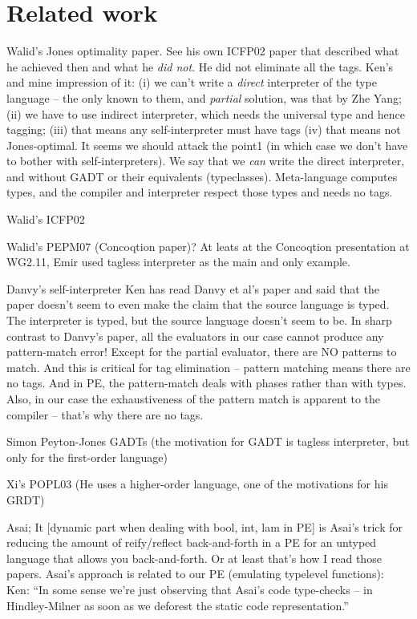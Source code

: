\documentclass[preprint]{sigplanconf}
\begin{document}
\section{Related work}
Walid's Jones optimality paper. See his own ICFP02 paper that
described what he achieved then and what he \emph{did not}. He did not
eliminate all the tags. Ken's and mine impression of it:
(i) we can't write a \emph{direct} interpreter of the type language
           -- the only known to them, and \emph{partial} solution, was 
              that by Zhe Yang;
(ii) we have to use indirect interpreter, which needs the universal
           type and hence tagging;
(iii) that means any self-interpreter must have tags
(iv) that means not Jones-optimal.
It seems we should attack the point1 (in which case we don't have to
bother with self-interpreters). We say that we \emph{can} write the direct
interpreter, and without GADT or their equivalents (typeclasses).
Meta-language computes types, and the compiler and interpreter respect
those types and needs no tags.


Walid's ICFP02

Walid's PEPM07 (Concoqtion paper)? At leats at the Concoqtion
presentation at WG2.11, Emir used tagless interpreter as the main and
only example.

Danvy's self-interpreter
Ken has read Danvy et al's paper and said that the paper
doesn't seem to even make the claim that the source language is
typed. The interpreter is typed, but the source language doesn't seem
to be.
In sharp contrast to Danvy's paper, all the evaluators in our case
cannot produce any pattern-match error! Except for the partial
evaluator, there are NO patterns to match. And this is critical for
tag elimination -- pattern matching means there are no tags. And in
PE, the pattern-match deals with phases rather than with types. Also,
in our case the exhaustiveness of the pattern match is apparent to the
compiler -- that's why there are no tags.

Simon Peyton-Jones GADTs (the motivation for GADT is tagless
interpreter, but only for the first-order language)

Xi's POPL03 (He uses a higher-order language, one of the motivations
for his GRDT)

Asai; 
It [dynamic part when dealing with bool, int, lam in PE] is
Asai's trick for reducing the amount of reify/reflect back-and-forth
in a PE for an untyped language that allows you back-and-forth.  Or at
least that's how I read those papers.
Asai's approach is related to our PE (emulating typelevel functions):
Ken: ``In some sense we're just observing that Asai's code type-checks
-- in Hindley-Milner as soon as we deforest the static code
representation.''
\end{document}
